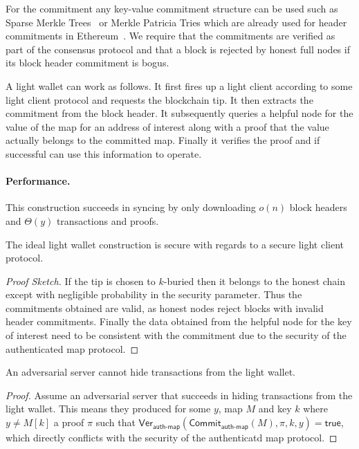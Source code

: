 For the commitment any key-value commitment structure can be used such as Sparse Merkle Trees~\cite{sparse-mt,revocation-transparency} or Merkle Patricia Tries which are already used for header commitments in Ethereum~\cite{wood2014ethereum}. We require that the commitments are verified as part of the consensus protocol and that a block is rejected by honest full nodes if its block header commitment is bogus.

A light wallet can work as follows. It first fires up a light client according to some light client protocol and requests the blockchain tip. It then extracts the commitment from the block header. It subsequently queries a helpful node for the value of the map for an address of interest along with a proof that the value actually belongs to the committed map. Finally it verifies the proof and if successful can use this information to operate.

\paragraph{Performance.} This construction succeeds in syncing by only downloading $o(n)$ block headers and $\Theta(y)$ transactions and proofs.
\begin{theorem}[Security]
The ideal light wallet construction is secure with regards to a secure light client protocol.
\end{theorem}
\begin{proof}[Proof Sketch]
If the tip is chosen to $k$-buried then it belongs to the honest chain except with negligible probability in the security parameter. Thus the commitments obtained are valid, as honest nodes reject blocks with invalid header commitments. Finally the data obtained from the helpful node for the key of interest need to be consistent with the commitment due to the security of the authenticated map protocol.
\end{proof}

\begin{theorem}[Uncensorability]
An adversarial server cannot hide transactions from the light wallet.
\end{theorem}
\begin{proof}
Assume an adversarial server that succeeds in hiding transactions from the light wallet. This means they produced for some $y$, map $M$ and key $k$ where $y \neq M[k]$ a proof $\pi$ such that $\textsf{Ver}_\textsf{auth-map}(\textsf{Commit}_\textsf{auth-map}(M), \pi, k, y) = \textsf{true}$, which directly conflicts with the security of the authenticatd map protocol.
\end{proof}

